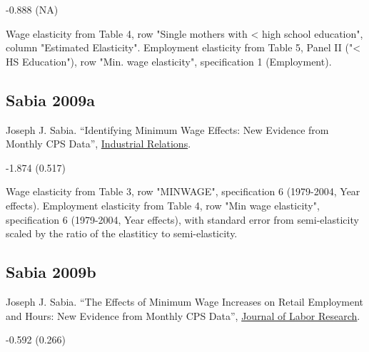 \vspace{0.7em}

 -0.888 (NA)

\vspace{0.7em}

 Wage elasticity from Table 4, row "Single mothers with < high school education", column "Estimated Elasticity". Employment elasticity from Table 5, Panel II ("< HS Education"), row "Min. wage elasticity", specification 1 (Employment).

\subsection*{Sabia 2009a}
\vspace{-0.7em}

\noindent Joseph J. Sabia. ``Identifying Minimum Wage Effects: New Evidence from Monthly CPS Data'', \href{https://doi.org/10.1111/j.1468-232X.2009.00559.x}{Industrial Relations}.

\vspace{0.7em}

 -1.874 (0.517)

\vspace{0.7em}

 Wage elasticity from Table 3, row "MINWAGE", specification 6 (1979-2004, Year effects). Employment elasticity from Table 4, row "Min wage elasticity", specification 6 (1979-2004, Year effects), with standard error from semi-elasticity scaled by the ratio of the elastiticy to semi-elasticity.

\subsection*{Sabia 2009b}
\vspace{-0.7em}

\noindent Joseph J. Sabia. ``The Effects of Minimum Wage Increases on Retail Employment and Hours: New Evidence from Monthly CPS Data'', \href{https://doi.org/10.1007/s12122-008-9054-1}{Journal of Labor Research}.

\vspace{0.7em}

 -0.592 (0.266)

\vspace{0.7em}

